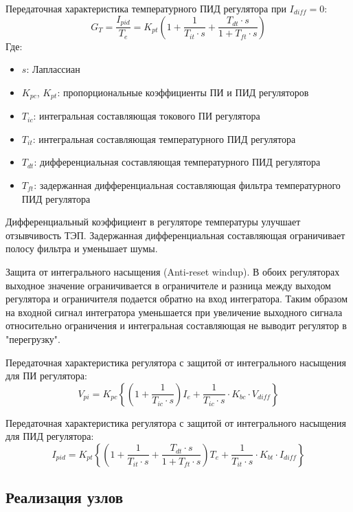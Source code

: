 Передаточная характеристика температурного ПИД регулятора при $I_{diff}=0$:
\begin{equation}
    G_T = \frac{I_{pid}}{T_e} = K_{pt} \left(1 + \frac{1}{T_{it}\cdot s} + \frac{T_{dt}\cdot s}{1 + T_{ft}\cdot s}\right)
\end{equation}
Где:
\begin{itemize}[label={}]
    \item $s$: Лаплассиан
    \item $K_{pc}$, $K_{pt}$: пропорциональные коэффициенты ПИ и ПИД регуляторов
    \item $T_{ic}$: интегральная составляющая токового ПИ регулятора
    \item $T_{it}$: интегральная составляющая температурного ПИД регулятора
    \item $T_{dt}$: дифференциальная составляющая температурного ПИД регулятора
    \item $T_{ft}$: задержанная дифференциальная составляющая фильтра температурного ПИД регулятора
\end{itemize}

Дифференциальный коэффициент в регуляторе температуры улучшает отзывчивость ТЭП. Задержанная дифференциальная
составляющая ограничивает полосу фильтра и уменьшает шумы.

Защита от интегрального насыщения (Anti-reset windup). В обоих регуляторах выходное значение ограничивается
в ограничителе и разница между выходом регулятора и ограничителя подается обратно на вход интегратора.
Таким образом на входной сигнал интегратора уменьшается при увеличение выходного сигнала относительно 
ограничения и интегральная составляющая не выводит регулятор в "перегрузку".

Передаточная характеристика регулятора с защитой от интегрального насыщения для ПИ регулятора:
\begin{equation}
    V_{pi} = K_{pc}\left\{\left(1+\frac{1}{T_{ic}\cdot s}\right)I_e + \frac{1}{T_{ic}\cdot s}\cdot K_{bc}\cdot V_{diff}\right\}
\end{equation}

Передаточная характеристика регулятора с защитой от интегрального насыщения для ПИД регулятора:
\begin{equation}
    I_{pid} = K_{pt}\left\{\left(1 + \frac{1}{T_{it}\cdot s}+\frac{T_{dt}\cdot s}{1+T_{ft}\cdot s}\right)
    T_e + \frac{1}{T_{it}\cdot s}\cdot K_{bt}\cdot I_{diff}\right \}
\end{equation}

\subsection{Реализация узлов}
